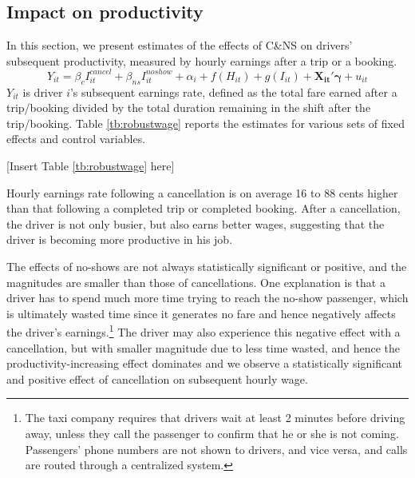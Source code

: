 \documentclass[reviewmode,AEJ]{AEA}
\begin{document}
\subsection{Impact on productivity}
In this section, we present estimates of the effects of C\&NS on drivers' subsequent productivity,
measured by hourly earnings after a trip or a booking.
\begin{equation}
\label{eq:outcomes}
Y_{it} = \beta_c I^{cancel}_{it} + \beta_{ns} I^{noshow}_{it} + \alpha_i + f(H_{it}) + g(I_{it}) + \mathbf{X_{it}}'\mathbf{\gamma}  + u_{it}
\end{equation}
$Y_{it}$ is driver $i$'s subsequent earnings rate, defined as the total fare earned after a trip/booking 
divided by the total duration remaining in the shift after the trip/booking. Table \ref{tb:robustwage} 
reports the estimates for various sets of fixed effects and control variables.

\begin{center}
	[Insert Table \ref{tb:robustwage} here]
\end{center}

Hourly earnings rate following a cancellation is on average 16 to 88 cents higher than that following a 
completed trip or completed booking. After a cancellation, the driver is not only busier, but also earns
better wages, suggesting that the driver is becoming more productive in his job. 

The effects of no-shows are not always statistically significant or positive, and the magnitudes are smaller
than those of cancellations. One explanation is that a driver has to spend much more time trying to reach
the no-show passenger, which is ultimately wasted time since it generates no fare and hence negatively 
affects the driver's earnings.\footnote{The taxi company requires that drivers wait at least 2 minutes 
before driving away, unless they call the passenger to confirm that he or she is not coming. Passengers' 
phone numbers are not shown to drivers, and vice versa, and calls are routed through a centralized system.}
The driver may also experience this negative effect with a cancellation, but with smaller magnitude due to 
less time wasted, and hence the productivity-increasing effect dominates and we observe a statistically
significant and positive effect of cancellation on subsequent hourly wage.
\end{document}
